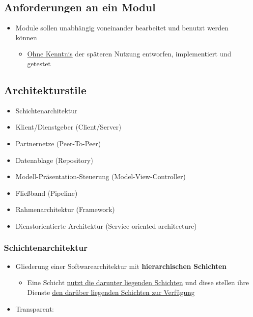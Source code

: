 \subsection{Anforderungen an ein Modul}

\begin{itemize}
\item Module sollen unabhängig voneinander bearbeitet und benutzt werden können
\begin{itemize}
\item \underline{Ohne Kenntnis} der späteren Nutzung entworfen, implementiert und getestet
\end{itemize}
\end{itemize}
	
\newpage
\subsection{Architekturstile}
		
\begin{itemize}
\item Schichtenarchitektur
\item Klient/Dienstgeber (Client/Server)
\item Partnernetze (Peer-To-Peer)
\item Datenablage (Repository)
\item Modell-Präsentation-Steuerung (Model-View-Controller)
\item Fließband (Pipeline)
\item Rahmenarchitektur (Framework)
\item Dienstorientierte Architektur (Service oriented architecture)
\end{itemize}
		
\subsubsection{Schichtenarchitektur}
			
\begin{itemize}
\item Gliederung einer Softwarearchitektur mit \textbf{hierarchischen Schichten}
\begin{itemize}
\item Eine Schicht \underline{nutzt die darunter liegenden Schichten}  und diese \newline stellen ihre Dienste \underline{den darüber liegenden Schichten zur Verfügung}
\end{itemize}
\item Transparent:
\end{itemize}		
				
